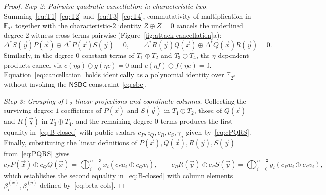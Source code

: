 \documentclass[11pt,a4paper]{article}
\theoremstyle{definition}
\theoremstyle{remark}
\newcommand{\Ftwo}{\mathbb{F}_2}
\newcommand{\Ftwok}{\mathbb{F}_{2^k}}
\newcommand{\NSBC}{\mathsf{NSBC}}
\begin{document}
\begin{proof}
\smallskip\noindent
\emph{Step 2: Pairwise quadratic cancellation in characteristic two.}
Summing~\eqref{eq:T1}--\eqref{eq:T2} and~\eqref{eq:T3}--\eqref{eq:T4}, commutativity of multiplication in $\Ftwok$ together with the characteristic-$2$ identity $Z \oplus Z = 0$ cancels the underlined degree-$2$ witness cross-terms pairwise (Figure~\ref{fig:attack-cancellation}a):
\begin{equation}
\label{eq:cancellation}
\Delta^* S(\vec{y}) P(\vec{x}) \oplus \Delta^* P(\vec{x}) S(\vec{y}) = 0, \qquad
\Delta^* R(\vec{y}) Q(\vec{x}) \oplus \Delta^* Q(\vec{x}) R(\vec{y}) = 0.
\end{equation}
Similarly, in the degree-$0$ constant terms of $T_1 \oplus T_2$ and $T_3 \oplus T_4$, the $\eta$-dependent products cancel via $c(\eta g) \oplus g(\eta c) = 0$ and $e(\eta f) \oplus f(\eta e) = 0$. Equation~\eqref{eq:cancellation} holds identically as a polynomial identity over $\Ftwok$ without invoking the $\NSBC$ constraint~\eqref{eq:sbc}.

\smallskip\noindent
\emph{Step 3: Grouping of $\Ftwo$-linear projections and coordinate columns.}
Collecting the surviving degree-$1$ coefficients of $P(\vec{x})$ and $S(\vec{y})$ in $T_1 \oplus T_2$, those of $Q(\vec{x})$ and $R(\vec{y})$ in $T_3 \oplus T_4$, and the remaining degree-$0$ terms produces the first equality in~\eqref{eq:B-closed} with public scalars $c_P, c_Q, c_R, c_S, \gamma_\sigma$ given by~\eqref{eq:cPQRS}. Finally, substituting the linear definitions of $P(\vec{x}), Q(\vec{x}), R(\vec{y}), S(\vec{y})$ from~\eqref{eq:PQRS} gives
\[
c_P P(\vec{x}) \oplus c_Q Q(\vec{x}) = \bigoplus_{i=0}^{n-3} x_i (c_P u_i \oplus c_Q v_i), \qquad
c_R R(\vec{y}) \oplus c_S S(\vec{y}) = \bigoplus_{i=0}^{n-3} y_i (c_R u_i \oplus c_S v_i),
\]
which establishes the second equality in~\eqref{eq:B-closed} with column elements $\beta_i^{(x)}, \beta_i^{(y)}$ defined by~\eqref{eq:beta-cols}.
\end{proof}
\end{document}

